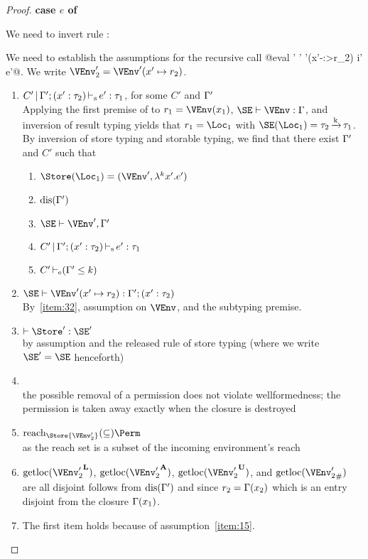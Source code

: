 \begin{proof}
  \newpage{}
  \textbf{case $e$ of}

  We need to invert rule :
  \begin{mathpar}
  \end{mathpar}

  We need to establish the assumptions for the recursive call
  @eval \Store' \Perm' \VEnv'(x'-:>r_2) i' e'@.
  We write $\VEnv_2' = \VEnv' (x'\mapsto r_2)$.
  \begin{enumerate}[({A1-}1)]
  \item $\inferS{C'}{\E'; \bvar{x'}{\tau_2}}{e'}{\tau_1}$, for some
    $C'$ and $\E'$\\
    Applying the first premise of  to $r_1 = \VEnv
    (x_1)$, $\SE \vdash \VEnv : \E$, and inversion of result typing
    yields that $r_1 = \Loc_1$ with $\SE (\Loc_1) = \tau_2 \tarr{k}
    \tau_1$.
    By inversion of store typing and storable typing, we find that
    there exist $\E'$ and $C'$ such that
    \begin{enumerate}
    \item $\Store (\Loc_1) = (\VEnv', \lam[k]{x'}{e'})$
    \item $\Disjoint{\E'}$
    \item\label{item:32} $\SE \vdash \VEnv', \E'$
    \item $\inferS{C'}{\E';\bvar {x'}{\tau_2}}{e'}{\tau_1}$
    \item $\addlin{\entail{C'}{\Cleq{\E'}{k}}}$
    \end{enumerate}
  \item $\SE \vdash \VEnv' (x' \mapsto r_2) : \E';
    \bvar{x'}{\tau_2}$\\
    By~\ref{item:32}, assumption on $\VEnv$, and the subtyping premise.
  \item $\vdash \Store' : \SE'$ \\
    by assumption and the released rule of store typing (where we
    write $\SE'=\SE$ henceforth)
  \item {} \\
    the possible removal of a permission does not violate
    wellformedness; the permission is taken away exactly when the
    closure is destroyed
  \item $\Reach\Store{\VEnv_2'} \subseteq \Perm$\\
    as the reach set is a subset of the incoming environment's reach
  \item $\Rawloc{\Active{\VEnv_2'}}$,
    $\Rawloc{\MutableBorrows{\VEnv_2'}}$,
    $\Rawloc{\ImmutableBorrows{\VEnv_2'}}$, and
    $\Rawloc{\Suspended{\VEnv_2'}}$ are all disjoint follows from
    $\Disjoint{\E'}$ and since $r_2= \E (x_2)$ which is an entry
    disjoint from the closure $\E(x_1)$.
  \item {}
    The first item holds because of assumption~\ref{item:15}.


\end{enumerate}
\end{proof}
